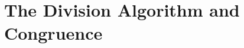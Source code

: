 \section{The Division Algorithm and Congruence}\label{S:divalgo}

\setcounter{previewactivity}{0}



%






%



\endinput
